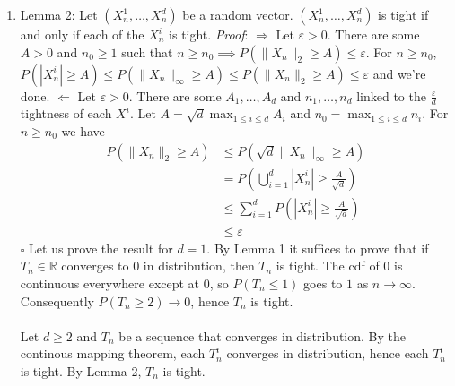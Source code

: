 \documentclass[a4paper,11pt]{article}
\begin{document}
\begin{enumerate}
  \item \underline{Lemma 2}: Let $(X_n^1,\ldots,X_n^d)$ be a random vector. $(X_n^1,\ldots,X_n^d)$ is tight if and only if each of the $X_n^i$ is tight.\newline
  \textit{Proof}: $\Rightarrow$ Let $\varepsilon>0$. There are some $A>0$ and $n_0\geq 1$ such that $n\geq n_0\implies P(\|X_n\|_2\geq A)\leq \varepsilon$. For $n\geq n_0$, $P(|X_n^i|\geq A) \leq P(\|X_n\|_\infty \geq A) \leq P(\|X_n\|_2 \geq A) \leq \varepsilon$ and we're done.\newline
  $\Leftarrow$ Let $\varepsilon>0$. There are some $A_1,\ldots,A_d$ and $n_1,\ldots,n_d$ linked to the $\displaystyle \frac{\varepsilon}d$ tightness of each $X^i$. Let $A=\sqrt d \max_{1\leq i \leq d} A_i$ and $n_0 = \max_{1\leq i \leq d} n_i$. For $n\geq n_0$ we have 
  $$\begin{aligned}
    P(\|X_n\|_2\geq A) &\leq P(\sqrt d \|X_n\|_\infty \geq A) \\
    &= P(\bigcup_{i=1}^d |X_n^i| \geq \frac A{\sqrt d})\\
    &\leq \sum_{i=1}^d  P(|X_n^i| \geq \frac A{\sqrt d})\\
    &\leq \varepsilon
  \end{aligned}$$
  \hfill $\square$\newline
  Let us prove the result for $d=1$. By Lemma 1 it suffices to prove that if $T_n\in \mathbb R$ converges to $0$ in distribution, then $T_n$ is tight. The cdf of $0$ is continuous everywhere except at $0$, so $P(T_n\leq 1)$ goes to $1$ as $n\to \infty$. Consequently $P(T_n\geq 2)\to 0$, hence $T_n$ is tight.\\ \\
  Let $d\geq 2$ and $T_n$ be a sequence that converges in distribution. By the continous mapping theorem, each $T_n^i$ converges in distribution, hence each $T_n^i$ is tight. By Lemma 2, $T_n$ is tight.


\end{enumerate}
\end{document}
